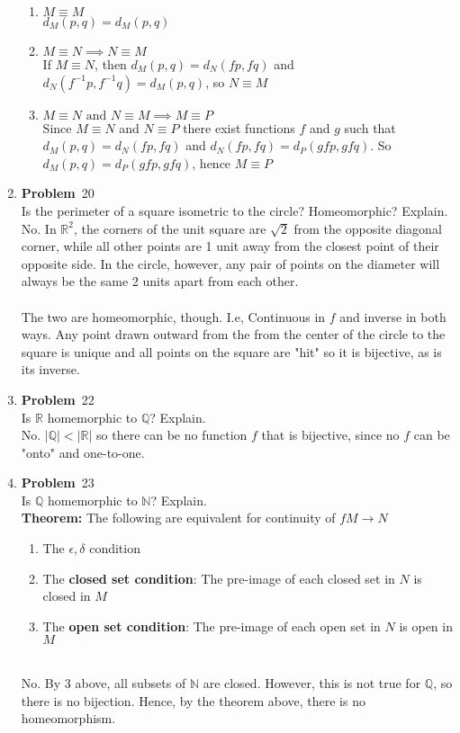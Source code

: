 \documentclass[12pt]{amsart}
\newcommand{\benu}{\begin{enumerate}}
\newcommand{\eenu}{\end{enumerate}}
\theoremstyle{definition}
\newcommand{\mbR}{\mathbb{R}}
\newcommand{\mbN}{\mathbb{N}}
\newcommand{\mbQ}{\mathbb{Q}}
\newcommand{\itep}{\item {\bfseries Problem}\ }
\begin{document}
\begin{enumerate}[series=p]
\benu
\item $M \equiv M$\\
$d_M(p,q) = d_M(p,q)$
\item $M \equiv N \implies N \equiv M$\\
If $M \equiv N$, then $d_M(p,q) = d_N(fp, fq)$ and $d_N(f^{-1}p, f^{-1}q) = d_M(p,q)$, so $N \equiv M$
\item $M \equiv N \text{ and }  N \equiv M \implies M \equiv P$\\
Since $M \equiv N$ and $N \equiv P$ there exist functions $f$ and $g$ such that $d_M(p,q) = d_N(fp, fq)$ and $d_N(fp, fq) = d_P(gfp, gfq)$.  So $d_M(p,q) =  d_P(gfp, gfq)$, hence $M \equiv P$
\eenu
\newpage

\itep 20\\
Is the perimeter of a square isometric to the circle?  Homeomorphic?  Explain.\\
No.  In $\mbR^2$, the corners of the unit square are $\sqrt{2}$ from the opposite diagonal corner, while all other points are 1 unit away from the closest point of their opposite side.  In the circle, however, any pair of points on the diameter will always be the same 2 units apart from each other.\\
\\
The two are homeomorphic, though.  I.e, Continuous in $f$ and inverse in both ways.  Any point drawn outward from the from the center of the circle to the square is unique and all points on the square are "hit" so it is bijective, as is its inverse.
\newpage

\itep 22\\
Is $\mbR$ homemorphic to $\mbQ$?  Explain.\\
No.  $|\mbQ| < |\mbR|$ so there can be no function $f$ that is bijective, since no $f$ can be "onto" and one-to-one.
\newpage

\itep 23\\
Is $\mbQ$ homemorphic to $\mbN$?  Explain.\\
\textbf{Theorem:} The following are equivalent for continuity of $fM \to N$
\benu
\item The $\epsilon, \delta$ condition
\item The \textbf{closed set condition}: The pre-image of each closed set in $N$ is closed in $M$
\item The \textbf{open set condition}: The pre-image of each open set in $N$ is open in $M$
\eenu
\leavevmode \\
No.  By 3 above, all subsets of $\mbN$ are closed.  However, this is not true for $\mbQ$, so there is no bijection.  Hence, by the theorem above, there is no homeomorphism.
\newpage


\end{enumerate}
\end{document}
